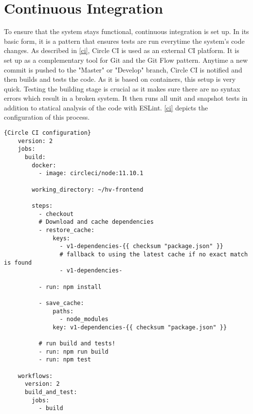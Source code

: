 \section{Continuous Integration}
To ensure that the system stays functional, continuous integration is set up. In its basic form, it is a pattern that ensures tests are run everytime the system's code changes. As described in \autoref{ci}, Circle CI is used as an external CI platform. It is set up as a complementary tool for Git and the Git Flow pattern. Anytime a new commit is pushed to the "Master" or "Develop" branch, Circle CI is notified and then builds and tests the code. As it is based on containers, this setup is very quick. Testing the building stage is crucial as it makes sure there are no syntax errors which result in a broken system. It then runs all unit and snapshot tests in addition to statical analysis of the code with ESLint. \autoref{ci} depicts the configuration of this process. \newline

\begin{lstlisting}[caption=Circle CI configuration, captionpos=b, style=htmlcssjs, label=ci]{Circle CI configuration}
    version: 2
    jobs:
      build:
        docker:
          - image: circleci/node:11.10.1
    
        working_directory: ~/hv-frontend
    
        steps:
          - checkout
          # Download and cache dependencies
          - restore_cache:
              keys:
                - v1-dependencies-{{ checksum "package.json" }}
                # fallback to using the latest cache if no exact match is found
                - v1-dependencies-
    
          - run: npm install
    
          - save_cache:
              paths:
                - node_modules
              key: v1-dependencies-{{ checksum "package.json" }}
    
          # run build and tests!
          - run: npm run build
          - run: npm test
    
    workflows:
      version: 2
      build_and_test:
        jobs:
          - build
    
    
  \end{lstlisting}